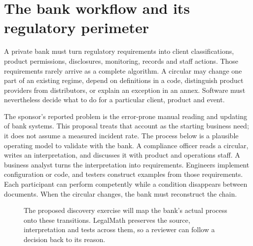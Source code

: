 \documentclass[12pt,a4paper,oneside,openany]{book}
\begin{document}
\section{The bank workflow and its regulatory perimeter}
\label{merge:P-01-problem:00}

\label{sec:problem}

A private bank must turn regulatory requirements into client classifications,
product permissions, disclosures, monitoring, records and staff actions. Those
requirements rarely arrive as a complete algorithm. A circular may change one
part of an existing regime, depend on definitions in a code, distinguish product
providers from distributors, or explain an exception in an annex. Software must
nevertheless decide what to do for a particular client, product and event.

The sponsor's reported problem is the error-prone manual reading and updating of
bank systems. This proposal treats that account as the starting business need;
it does not assume a measured incident rate. The process below is a plausible
operating model to validate with the bank. A compliance officer reads a circular,
writes an interpretation, and discusses it with product and operations staff. A
business analyst turns the interpretation into requirements. Engineers implement
configuration or code, and testers construct examples from those requirements.
Each participant can perform competently while a condition disappears between
documents. When the circular changes, the bank must reconstruct the chain.

\begin{figure}[htbp]
\centering
{}
\caption{The proposed discovery exercise will map the bank's actual process onto
these transitions. LegalMath preserves the source, interpretation and tests across
them, so a reviewer can follow a decision back to its reason.}
\label{fig:manual}
\end{figure}
\end{document}
